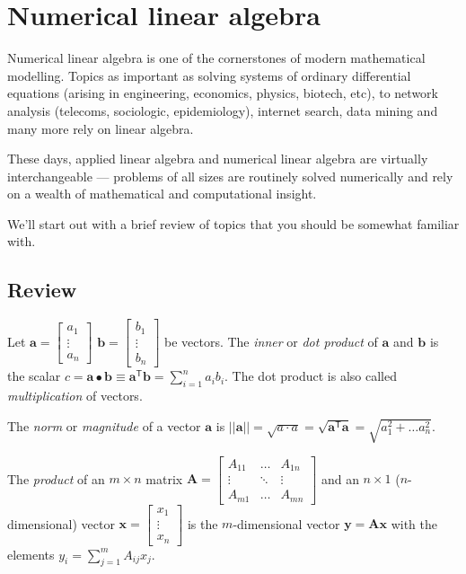 \section{Numerical linear algebra}

Numerical linear algebra is one of the cornerstones of modern mathematical modelling.  Topics as important as solving systems of ordinary differential equations (arising in engineering, economics, physics, biotech, etc),  to network analysis (telecoms, sociologic, epidemiology), internet search, data mining and many more rely on linear algebra.  

These days, applied linear algebra and numerical linear algebra are virtually interchangeable --- problems of all sizes are routinely solved numerically and rely on a wealth of mathematical and computational insight.  

We'll start out with a brief review of topics that you should be somewhat familiar with.


\subsection{Review}

Let $\mathbf{a}=\left[\begin{array}{c}a_1\\ \vdots \\ a_n\end{array}\right]$    
$\mathbf{b}=\left[\begin{array}{c}b_1\\ \vdots \\ b_n\end{array}\right]$ be vectors.  The {\em inner} or {\em dot product} of $\mathbf{a}$ and $\mathbf{b}$  is 
the scalar $c=\mathbf{a}\bullet\mathbf{b} \equiv \mathbf{a}^{\mathsf{T}}\mathbf{b} =\sum\limits_{i=1}^n a_i b_i$. 
The dot product is also called {\em multiplication} of vectors.

The {\em norm} or {\em magnitude} of a vector $\mathbf a$ is  $||\mathbf a|| = \sqrt{a \cdot a} =  \sqrt{\mathbf a^{\mathsf T} \mathbf a} = \sqrt{a_1^2 + \ldots a_n^2}$.

The {\em product} of an $m \times n$ {matrix} 
$\mathbf{A} = \left[ \begin{array}{ccc} A_{11}& \ldots & A_{1n}\\ \vdots &\ddots &\vdots \\ A_{m1}& \ldots &A_{mn} \end{array}\right]$
and an $n\times 1$ ($n$-dimensional) {vector} $\mathbf{x}=\left[\begin{array}{c}x_1\\\vdots\\x_n\end{array}\right]$ is
the $m$-dimensional vector $\mathbf{y}=\mathbf{Ax}$ with the elements $y_i=\sum\limits_{j=1}^m A_{ij}x_j$.

